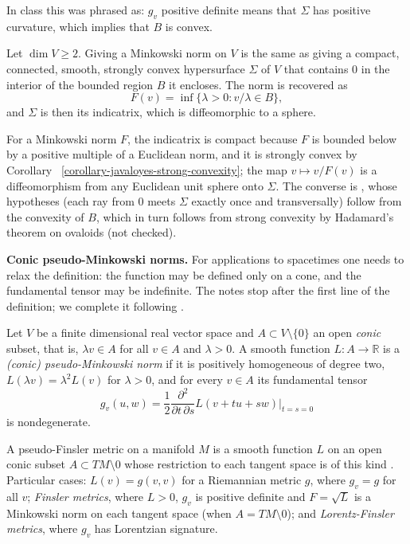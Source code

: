 \noindent
In class this was phrased as: $g_v$
positive definite means that $\Sigma$ has
positive curvature, which implies that $B$
is convex.

\begin{proposition}
\label{proposition-javaloyes-indicatrix}
Let $\dim V \geq 2$. Giving a Minkowski
norm on $V$ is the same as giving a
compact, connected, smooth, strongly
convex hypersurface $\Sigma$ of $V$ that
contains $0$ in the interior of the
bounded region $B$ it encloses. The
norm is recovered as
$$
F(v) = \inf \{\lambda > 0 :
v/\lambda \in B\},
$$
and $\Sigma$ is then its indicatrix, which
is diffeomorphic to a sphere.
\end{proposition}

\noindent
For a Minkowski norm $F$, the indicatrix
is compact because $F$ is bounded below by
a positive multiple of a Euclidean norm, and
it is strongly convex by
Corollary~%
\ref{corollary-javaloyes-strong-convexity};
the map $v \mapsto v/F(v)$ is a
diffeomorphism from any Euclidean unit
sphere onto $\Sigma$. The converse is
\cite[Theorem 2.14]{javaloyes2014definition},
whose hypotheses (each ray from $0$ meets
$\Sigma$ exactly once and transversally)
follow from the convexity of $B$, which in
turn follows from strong convexity by
Hadamard's theorem on ovaloids (not
checked).

\medskip\noindent
{\bf Conic pseudo-Minkowski norms.}
For applications to spacetimes one needs to
relax the definition: the function may be
defined only on a cone, and the fundamental
tensor may be indefinite. The notes stop
after the first line of the definition; we
complete it following
\cite[Section 2]{javaloyes2014chern}.

\begin{definition}
\label{definition-javaloyes-pseudo-norm}
Let $V$ be a finite dimensional real vector
space and $A \subset V \setminus \{0\}$ an
open \emph{conic} subset, that is,
$\lambda v \in A$ for all $v \in A$ and
$\lambda > 0$. A smooth function
$L : A \to \mathbb{R}$ is a
\emph{(conic) pseudo-Minkowski norm} if it
is positively homogeneous of degree two,
$L(\lambda v) = \lambda^2 L(v)$ for
$\lambda > 0$, and for every $v \in A$ its
fundamental tensor
$$
g_v(u,w) = \frac{1}{2}
\frac{\partial^2}{\partial t \, \partial s}
L(v + tu + sw) \Big|_{t=s=0}
$$
is nondegenerate.
\end{definition}

\noindent
A pseudo-Finsler metric on a manifold $M$
is a smooth function $L$ on an open conic
subset $A \subset TM \setminus 0$ whose
restriction to each tangent space is of
this kind \cite[Section 2]%
{javaloyes2014chern}. Particular cases:
$L(v) = g(v,v)$ for a Riemannian metric
$g$, where $g_v = g$ for all $v$;
\emph{Finsler metrics}, where $L > 0$,
$g_v$ is positive definite and
$F = \sqrt{L}$ is a Minkowski norm on each
tangent space (when $A = TM \setminus 0$);
and \emph{Lorentz-Finsler metrics}, where
$g_v$ has Lorentzian signature.


